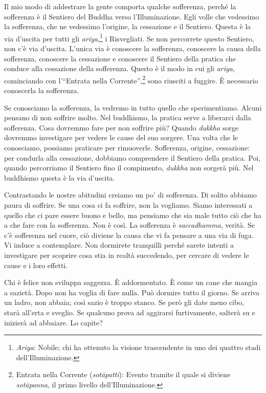 Il mio modo di addestrare la gente comporta qualche sofferenza, perché
la sofferenza è il Sentiero del Buddha verso l'Illuminazione. Egli
volle che vedessimo la sofferenza, che ne vedessimo l'origine, la
cessazione e il Sentiero. Questa è la via d'uscita per tutti gli
\emph{ariya},\footnote{\emph{Ariya}: Nobile; chi ha ottenuto la visione
  trascendente in uno dei quattro stadi dell'Illuminazione.} i
Risvegliati. Se non percorrete questo Sentiero, non c'è via d'uscita.
L'unica via è conoscere la sofferenza, conoscere la causa della
sofferenza, conoscere la cessazione e conoscere il Sentiero della
pratica che conduce alla cessazione della sofferenza. Questo è il modo
in cui gli \emph{ariya}, cominciando con l'``Entrata nella
Corrente'',\footnote{Entrata nella Corrente (\emph{sotāpatti}): Evento
  tramite il quale si diviene \emph{sotāpanna}, il primo livello
  dell'Illuminazione.} sono riusciti a fuggire. È necessario conoscerla
la sofferenza.

Se conosciamo la sofferenza, la vedremo in tutto quello che
sperimentiamo. Alcuni pensano di non soffrire molto. Nel buddhismo, la
pratica serve a liberarci dalla sofferenza. Cosa dovremmo fare per non
soffrire più? Quando \emph{dukkha} sorge dovremmo investigare per vedere
le cause del suo sorgere. Una volta che le conosciamo, possiamo
praticare per rimuoverle. Sofferenza, origine, cessazione: per condurla
alla cessazione, dobbiamo comprendere il Sentiero della pratica. Poi,
quando percorriamo il Sentiero fino il compimento, \emph{dukkha} non
sorgerà più. Nel buddhismo questa è la via d'uscita.

Contrastando le nostre abitudini creiamo un po' di sofferenza. Di solito
abbiamo paura di soffrire. Se una cosa ci fa soffrire, non la vogliamo.
Siamo interessati a quello che ci pare essere buono e bello, ma pensiamo
che sia male tutto ciò che ha a che fare con la sofferenza. Non è così.
La sofferenza è \emph{saccadhamma}, verità. Se c'è sofferenza nel cuore,
ciò diviene la causa che vi fa pensare a una via di fuga. Vi induce a
contemplare. Non dormirete tranquilli perché sarete intenti a
investigare per scoprire cosa stia in realtà succedendo, per cercare di
vedere le cause e i loro effetti.

Chi è felice non sviluppa saggezza. È addormentato. È come un cane che
mangia a sazietà. Dopo non ha voglia di fare nulla. Può dormire tutto il
giorno. Se arriva un ladro, non abbaia; così sazio è troppo stanco. Se
però gli date meno cibo, starà all'erta e sveglio. Se qualcuno prova ad
aggirarsi furtivamente, salterà su e inizierà ad abbaiare. Lo capite?

